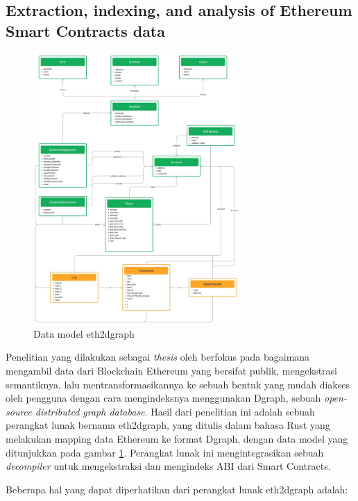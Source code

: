 \subsection{Extraction, indexing, and analysis of Ethereum Smart Contracts data}
\label{subsec:extraction-indexing-analysis-ethereum-sc}

\begin{figure}[ht]
  \centering
  \includegraphics[width=0.7\textwidth]{resources/chapter-2/eth2dgraph-structure.jpg}
  \caption{Data model eth2dgraph \parencite{aimar2023extraction}}
  \label{image:eth2dgraph-structure}
\end{figure}

Penelitian yang dilakukan sebagai \textit{thesis} oleh \cite{aimar2023extraction} berfokus pada bagaimana mengambil data dari Blockchain Ethereum yang bersifat publik, mengekstrasi semantiknya, lalu mentransformasikannya ke sebuah bentuk yang mudah diakses oleh pengguna dengan cara mengindeksnya menggunakan Dgraph, sebuah \textit{open-source distributed graph database}. Hasil dari penelitian ini adalah sebuah perangkat lunak bernama eth2dgraph, yang ditulis dalam bahasa Rust yang melakukan mapping data Ethereum ke format Dgraph, dengan data model yang ditunjukkan pada gambar \ref{image:eth2dgraph-structure}. Perangkat lunak ini mengintegrasikan sebuah \textit{decompiler} untuk mengekstraksi dan mengindeks ABI dari Smart Contracts.

Beberapa hal yang dapat diperhatikan dari perangkat lunak eth2dgraph adalah:

